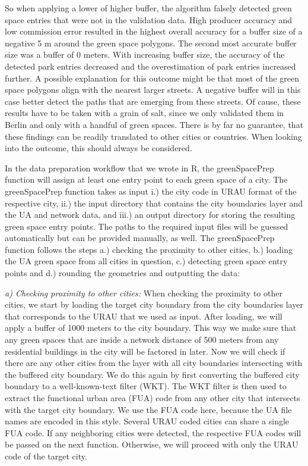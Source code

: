 \documentclass[10pt]{article}
\begin{document}
So when applying a lower of higher buffer, the algorithm falsely detected green space entries that were not in the validation data.
High producer accuracy and low commission error resulted in the highest overall accuracy for a buffer size of a negative 5 m around the green space polygons.
The second most accurate buffer size was a buffer of 0 meters. 
With increasing buffer size, the accuracy of the detected park entries decreased and the overestimation of park entries increased further.
A possible explanation for this outcome might be that most of the green space polygons align with the nearest larger streets.
A negative buffer will in this case better detect the paths that are emerging from these streets.
Of cause, these results have to be taken with a grain of salt, since we only validated them in Berlin and only with a handful of green spaces.
There is by far no guarantee, that these findings can be readily translated to other cities or countries.
When looking into the outcome, this should always be considered.

In the data preparation workflow that we wrote in R, the greenSpacePrep function will assign at least one entry point to each green space of a city.
The greenSpacePrep function takes as input i.) the city code in URAU format of the respective city, ii.) the input directory that contains the city boundaries layer and the UA and network data, and iii.) an output directory for storing the resulting green space entry points.
The paths to the required input files will be guessed automatically but can be provided manually, as well.
The greenSpacePrep function follows the steps a.) checking the proximity to other cities, b.) loading the UA green space from all cities in question, c.) detecting green space entry points and d.) rounding the geometries and outputting the data:

\textit{a) Checking proximity to other cities:} When checking the proximity to other cities, we start by loading the target city boundary from the city boundaries layer that corresponds to the URAU that we used as input. After loading, we will apply a buffer of 1000 meters to the city boundary. This way we make sure that any green spaces that are inside a network distance of 500 meters from any residential buildings in the city will be factored in later. Now we will check if there are any other cities from the layer with all city boundaries intersecting with the buffered city boundary. We do this again by first converting the buffered city boundary to a well-known-text filter (WKT). The WKT filter is then used to extract the functional urban area (FUA) code from any other city that intersects with the target city boundary. We use the FUA code here, because the UA file names are encoded in this style. Several URAU coded cities can share a single FUA code. If any neighboring cities were detected, the respective FUA codes will be passed on the next function. Otherwise, we will proceed with only the URAU code of the target city.
\end{document}
